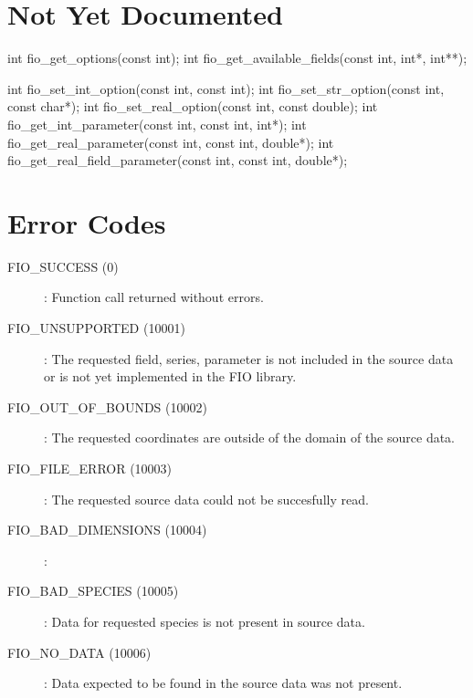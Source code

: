\documentclass{article}
\begin{document}
\section{Not Yet Documented}

int fio\_get\_options(const int);
int fio\_get\_available\_fields(const int, int*, int**);

int fio\_set\_int\_option(const int, const int);
int fio\_set\_str\_option(const int, const char*);
int fio\_set\_real\_option(const int, const double);
int fio\_get\_int\_parameter(const int, const int,  int*);
int fio\_get\_real\_parameter(const int, const int, double*);
int fio\_get\_real\_field\_parameter(const int, const int, double*);

\section{Error Codes}

\begin{description}
  \item[FIO\_SUCCESS (0)]:  Function call returned without errors.
  \item[FIO\_UNSUPPORTED (10001)]: The requested field, series,
    parameter is not included in the source data or is not yet
    implemented in the FIO library.
  \item[FIO\_OUT\_OF\_BOUNDS (10002)]: The requested coordinates are
    outside of the domain of the source data.
  \item[FIO\_FILE\_ERROR (10003)]: The requested source data could not be succesfully read.
  \item[FIO\_BAD\_DIMENSIONS (10004)]: 
  \item[FIO\_BAD\_SPECIES (10005)]: Data for requested species is not
    present in source data.
  \item[FIO\_NO\_DATA (10006)]: Data expected to be found in the source
    data was not present.
\end{description}
\end{document}
